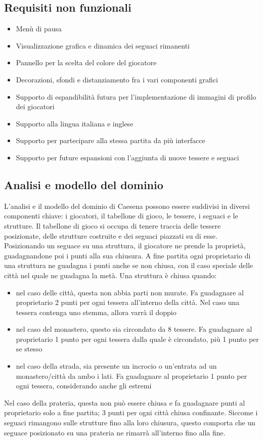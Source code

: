 \subsection*{Requisiti non funzionali}
\begin{itemize}
\item Menù di pausa
\item Visualizzazione grafica e dinamica dei seguaci rimanenti
\item Pannello per la scelta del colore del giocatore
\item Decorazioni, sfondi e distanziamento fra i vari componenti grafici
\item Supporto di espandibilità futura per l'implementazione di immagini di profilo dei giocatori
\item Supporto alla lingua italiana e inglese
\item Supporto per partecipare alla stessa partita da più interfacce
\item Supporto per future espansioni con l'aggiunta di nuove tessere e seguaci
\end{itemize}

\subsection{Analisi e modello del dominio}

L'analisi e il modello del dominio di Caesena possono essere suddivisi in diversi componenti chiave: i giocatori, il tabellone di gioco, le tessere, i seguaci e le strutture. Il tabellone di gioco si occupa di tenere traccia delle tessere posizionate, delle  strutture costruite e dei seguaci piazzati su di esse. Posizionando un seguace su una struttura, il giocatore ne prende la proprietà, guadagnandone poi i punti alla sua chiusura. A fine partita ogni proprietario di una struttura ne guadagna i punti anche se non chiusa, con il caso speciale delle città nel quale ne guadagna la metà. Una struttura è chiusa quando:
\begin{itemize}
    \item nel caso delle città, questa non abbia parti non murate. Fa guadagnare al proprietario 2 punti per ogni tessera all'interno della città. Nel caso una tessera contenga uno stemma, allora varrà il doppio
    \item nel caso del monastero, questo sia circondato da 8 tessere. Fa guadagnare al proprietario 1 punto per ogni tessera dalla quale è circondato, più 1 punto per se stesso
    \item nel caso della strada, sia presente un incrocio o un'entrata ad un monastero/città da ambo i lati. Fa guadagnare al proprietario 1 punto per ogni tessera, considerando anche gli estremi
\end{itemize}
Nel caso della prateria, questa non può essere chiusa e fa guadagnare punti al proprietario solo a fine partita; 3 punti per ogni città chiusa confinante. Siccome i seguaci rimangono sulle strutture fino alla loro chiusura, questo comporta che un seguace posizionato su una prateria ne rimarrà all'interno fino alla fine.


